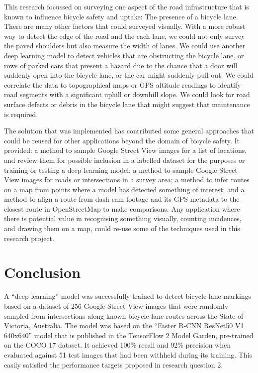 \documentclass[11pt,twoside]{report}
\begin{document}
This research focussed on surveying one aspect of the road infrastructure that is known to influence bicycle safety and uptake:  The presence of a bicycle lane.  There are many other factors that could surveyed visually.  With a more robust way to detect the edge of the road and the each lane, we could not only survey the paved shoulders but also measure the width of lanes.  We could use another deep learning model to detect vehicles that are obstructing the bicycle lane, or rows of parked cars that present a hazard due to the chance that a door will suddenly open into the bicycle lane, or the car might suddenly pull out.  We could correlate the data to topographical maps or GPS altitude readings to identify road segments with a significant uphill or downhill slope.  We could look for road surface defects or debris in the bicycle lane that might suggest that maintenance is required.

The solution that was implemented has contributed some general approaches that could be reused for other applications beyond the domain of bicycle safety.  It provided:  a method to sample Google Street View images for a list of locations, and review them for possible inclusion in a labelled dataset for the purposes or training or testing a deep learning model;  a method to sample Google Street View images for roads or intersections in a survey area;  a method to infer routes on a map from points where a model has detected something of interest;  and a method to align a route from dash cam footage and its GPS metadata to the closest route in OpenStreetMap to make comparisons.  Any application where there is potential value in recognising something visually, counting incidences, and drawing them on a map, could re-use some of the techniques used in this research project.


\chapter{Conclusion}
\label{conclusion}

A ``deep learning'' model was successfully trained to detect bicycle lane markings based on a dataset of 256 Google Street View images that were randomly sampled from intersections along known bicycle lane routes across the State of Victoria, Australia.  The model was based on the ``Faster R-CNN ResNet50 V1 640x640'' model that is published in the TensorFlow 2 Model Garden, pre-trained on the COCO 17 dataset.  It achieved 100\% recall and 92\% precision when evaluated against 51 test images that had been withheld during its training.  This easily satisfied the performance targets proposed in research question 2.
\end{document}

